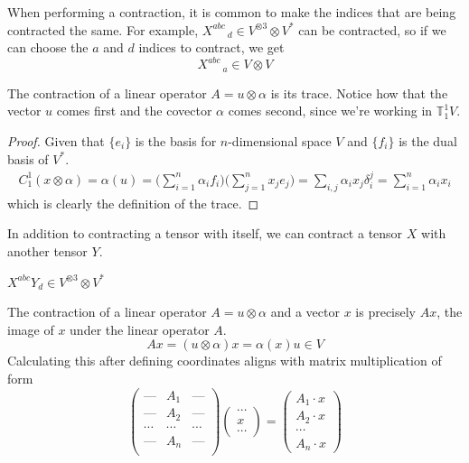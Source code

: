   \begin{example}
    When performing a contraction, it is common to make the indices that are being contracted the same. For example, $X^{a b c}_{\;\;\;\;\;\; d} \in V^{\otimes 3} \otimes V^*$ can be contracted, so if we can choose the $a$ and $d$ indices to contract, we get 
    \[X^{a b c}_{\;\;\;\;\;\; a} \in V \otimes V\]
  \end{example}

  \begin{theorem}
    The contraction of a linear operator $A = u \otimes \alpha$ is its trace. Notice how that the vector $u$ comes first and the covector $\alpha$ comes second, since we're working in $\mathbb{T}^1_1 V$. 
  \end{theorem}
  \begin{proof}
    Given that $\{e_i\}$ is the basis for $n$-dimensional space $V$ and $\{f_i\}$ is the dual basis of $V^*$.
    \begin{align*}
      C^1_1 (x \otimes \alpha) = \alpha (u) 
      = \Big( \sum_{i=1}^n \alpha_i f_i  \Big) \Big( \sum_{j=1}^n x_j e_j \Big)  = \sum_{i, j} \alpha_i x_j \delta^j_i = \sum_{i=1}^n \alpha_i x_i 
    \end{align*}
    which is clearly the definition of the trace. 
  \end{proof}

  In addition to contracting a tensor with itself, we can contract a tensor $X$ with another tensor $Y$. 

  \begin{example}
    $X^{a b c} Y_d \in V^{\otimes 3} \otimes V^*$ 
  \end{example}

  \begin{theorem}
    The contraction of a linear operator $A = u \otimes \alpha$ and a vector $x$ is precisely $A x$, the image of $x$ under the linear operator $A$. 
    \[A x = (u \otimes \alpha) x = \alpha (x) u \in V\]
    Calculating this after defining coordinates aligns with matrix multiplication of form
    \[\begin{pmatrix}
    \text{---} & A_1 & \text{---} \\
    \text{---} & A_2 & \text{---} \\
    \cdots & \cdots & \cdots \\
    \text{---} & A_n & \text{---} \\
    \end{pmatrix} \begin{pmatrix}
    \cdots \\ x \\ \cdots 
    \end{pmatrix} = \begin{pmatrix}
     A_1 \cdot x \\ A_2 \cdot x \\ \cdots \\ A_n \cdot x
    \end{pmatrix}\]
  \end{theorem}

